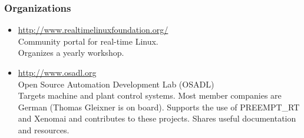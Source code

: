 \begin{frame}
  \frametitle{Organizations}
  \begin{itemize}
  \item \url{http://www.realtimelinuxfoundation.org/}\\
    Community portal for real-time Linux.\\
    Organizes a yearly workshop.
  \item \url{http://www.osadl.org}\\
    Open Source Automation Development Lab (OSADL)\\
    Targets machine and plant control systems. Most member companies
    are German (Thomas Gleixner is on board). Supports the use of
    PREEMPT\_RT and Xenomai and contributes to these projects. Shares
    useful documentation and resources.
  \end{itemize}
\end{frame}
